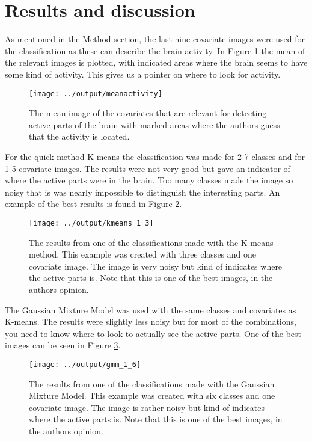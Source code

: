 \documentclass[a4paper,english]{article}
\begin{document}
\section{Results and discussion}

As mentioned in the Method section, the last nine covariate images were used for the classification as these can describe the brain activity. In Figure \ref{fig:mean} the mean of the relevant images is plotted, with indicated areas where the brain seems to have some kind of activity. This gives us a pointer on where to look for activity.

\begin{figure}[H]
	\centering
    \texttt{[image: ../output/meanactivity]}
    \caption{The mean image of the covariates that are relevant for detecting active parts of the brain with marked areas where the authors guess that the activity is located.}
    \label{fig:mean}
\end{figure}

For the quick method K-means the classification was made for 2-7 classes and for 1-5 covariate images. The results were not very good but gave an indicator of where the active parts were in the brain. Too many classes made the image so noisy that is was nearly impossible to distinguish the interesting parts. An example of the best results is found in Figure \ref{fig:kmeans}.

\begin{figure}[H]
	\centering
    \texttt{[image: ../output/kmeans\_1\_3]}
    \caption{The results from one of the classifications made with the K-means method. This example was created with three classes and one covariate image. The image is very noisy but kind of indicates where the active parts is. Note that this is one of the best images, in the authors opinion.}
    \label{fig:kmeans}
\end{figure}

The Gaussian Mixture Model was used with the same classes and covariates as K-means. The results were slightly less noisy but for most of the combinations, you need to know where to look to actually see the active parts. One of the best images can be seen in Figure \ref{fig:gmm}.


\begin{figure}[H]
	\centering
    \texttt{[image: ../output/gmm\_1\_6]}
    \caption{The results from one of the classifications made with the Gaussian Mixture Model. This example was created with six classes and one covariate image. The image is rather noisy but kind of indicates where the active parts is. Note that this is one of the best images, in the authors opinion.}
    \label{fig:gmm}
\end{figure}
\end{document}
